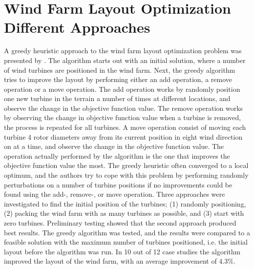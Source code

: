 \section{Wind Farm Layout Optimization Different Approaches}\label{section:relatedworkother}


A greedy heuristic approach to the wind farm layout optimization problem was presented by \cite{Ozturk}. The algorithm starts out with an initial solution, where a number of wind turbines are positioned in the wind farm. Next, the greedy algorithm tries to improve the layout by performing either an add operation, a remove operation or a move operation. The add operation works by randomly position one new turbine in the terrain a number of times at different locations, and observe the change in the objective function value. The remove operation works by observing the change in objective function value when a turbine is removed, the process is repeated for all turbines. A move operation consist of moving each turbine 4 rotor diameters away from its current position in eight wind direction on at a time, and observe the change in the objective function value. The operation actually performed by the algorithm is the one that improves the objective function value the most. The greedy heuristic often converged to a local optimum, and the authors try to cope with this problem by performing randomly perturbations on a number of turbine positions if no improvements could be found using the add-, remove-, or move operation. Three approaches were investigated to find the initial position of the turbines; (1) randomly positioning, (2) packing the wind farm with as many turbines as possible, and (3) start with zero turbines. Preliminary testing showed that the second approach produced best results. The greedy algorithm was tested, and the results were compared to a feasible solution with the maximum number of turbines positioned, i.e. the initial layout before the algorithm was run. In 10 out of 12 case studies the algorithm improved the layout of the wind farm, with an average improvement of 4.3\%. \\


